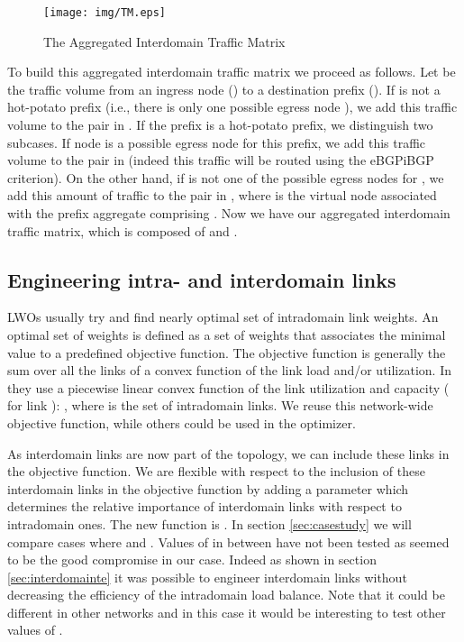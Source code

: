 \documentclass{acm_proc_article-sp}
\begin{document}
\begin{figure}[htbp]
  \centering
  \texttt{[image: img/TM.eps]}
  \caption{The Aggregated Interdomain Traffic Matrix}
  \label{fig:tm}
\end{figure}

To build this aggregated interdomain traffic matrix we proceed as follows.
Let  
be the traffic volume from an ingress node ()
to a destination prefix (). If 
 is not a hot-potato prefix (i.e., there is only one
possible egress node ), we add this traffic volume 
to the pair  in . If the prefix  is a hot-potato prefix, we
distinguish two subcases. If node  is a possible egress node 
for this prefix, we add this 
traffic volume to the pair  in  (indeed this traffic
will be routed using the eBGPiBGP criterion). On the other hand, if  is not
one of the possible egress nodes for , 
we add this
amount of traffic to the pair  in , where  is the virtual node associated with the prefix aggregate 
comprising . Now we have our aggregated interdomain traffic matrix,
which is composed of  and .

\subsection{Engineering intra- and interdomain links}
\label{engineeringinter}

LWOs usually try and find nearly optimal set of intradomain link weights.
An optimal set of weights is defined as a set of weights that
associates the minimal value to a predefined objective function. The
objective function is generally the sum over all the links 
of a convex function of the link load and/or utilization. In \cite{fortz1}
they use a piecewise linear convex function of the link utilization and
capacity ( for link ): , where  is the set of
intradomain links. We reuse this network-wide objective function, while
others could be used in the optimizer.

As interdomain
links are now part of the topology, we can include these links in the
objective function. We are flexible with respect to the inclusion
of these interdomain links in the objective function by adding a
parameter  which determines the relative importance of
interdomain links with respect to intradomain ones. The new
function is . In section \ref{sec:casestudy} we will compare
cases where  and . Values of  in
  between have not been tested as  seemed to be the good
  compromise in our case. Indeed as shown in section
  \ref{sec:interdomainte} it was possible to engineer interdomain
  links without decreasing the efficiency of the intradomain load
  balance. Note that it could be different in other networks and in
  this case it would be interesting to test other values of .
\end{document}
